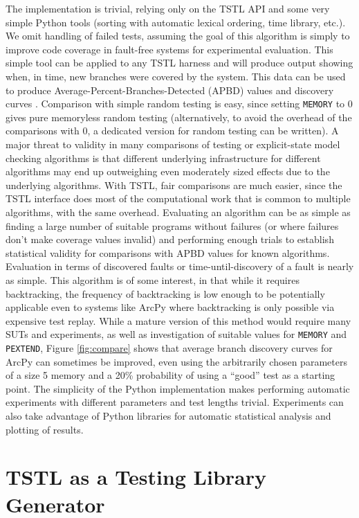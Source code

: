 The implementation is trivial, relying only on the TSTL API and some very simple Python tools (sorting with automatic lexical ordering, time library, etc.).  We omit handling of failed tests, assuming the goal of this algorithm is simply to improve code coverage in fault-free systems for experimental evaluation.  This simple tool can be applied to any TSTL harness and will produce output showing when, in time, new branches were covered by the system.  This data can be used to produce Average-Percent-Branches-Detected (APBD) values and discovery curves \cite{issta14,Rothermel1999,rothermel01oct}. Comparison with simple random testing is easy, since setting {\tt MEMORY} to 0 gives pure memoryless random testing (alternatively, to avoid the overhead of the comparisons with 0, a dedicated version for random testing can be written).  A major threat to validity in many comparisons of testing or explicit-state model checking algorithms is that different underlying infrastructure for different algorithms may end up outweighing even moderately sized effects due to the underlying algorithms.  With TSTL, fair comparisons are much easier, since the TSTL interface does most of the computational work that is common to multiple algorithms, with the same overhead.  Evaluating an algorithm can be as simple as finding a large number of suitable programs without failures (or where failures don't make coverage values invalid) and performing enough trials to establish statistical validity for comparisons with APBD values for known algorithms.  Evaluation in terms of discovered faults or time-until-discovery of a fault is nearly as simple.  This algorithm is of some interest, in that while it requires backtracking, the frequency of backtracking is low enough to be potentially applicable even to systems like ArcPy where backtracking is only possible via expensive test replay.  While a mature version of this method would require many SUTs and experiments, as well as investigation of suitable values for {\tt MEMORY} and {\tt PEXTEND}, Figure \ref{fig:compare} shows that average branch discovery curves for ArcPy can sometimes be improved, even using the  arbitrarily chosen parameters of a size 5 memory and a 20\% probability of using a ``good'' test as a starting point.  The simplicity of the Python implementation makes performing automatic experiments with different parameters and test lengths trivial.  Experiments can also take advantage of Python libraries for automatic statistical analysis and plotting of results.


\section{TSTL as a Testing Library Generator}
\label{sec:langext}

